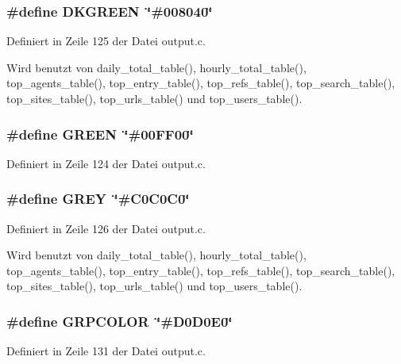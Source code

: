 \subsubsection{\setlength{\rightskip}{0pt plus 5cm}\#define DKGREEN~\char`\"{}\#008040\char`\"{}}\label{output_8c_70a867a7d5bd5ff0aa67003c99b93a8f}




Definiert in Zeile 125 der Datei output.c.

Wird benutzt von daily\_\-total\_\-table(), hourly\_\-total\_\-table(), top\_\-agents\_\-table(), top\_\-entry\_\-table(), top\_\-refs\_\-table(), top\_\-search\_\-table(), top\_\-sites\_\-table(), top\_\-urls\_\-table() und top\_\-users\_\-table().
\subsubsection{\setlength{\rightskip}{0pt plus 5cm}\#define GREEN~\char`\"{}\#00FF00\char`\"{}}\label{output_8c_cfbc006ea433ad708fdee3e82996e721}




Definiert in Zeile 124 der Datei output.c.
\subsubsection{\setlength{\rightskip}{0pt plus 5cm}\#define GREY~\char`\"{}\#C0C0C0\char`\"{}}\label{output_8c_dce122f566c88a1eceeb79a635afa964}




Definiert in Zeile 126 der Datei output.c.

Wird benutzt von daily\_\-total\_\-table(), hourly\_\-total\_\-table(), top\_\-agents\_\-table(), top\_\-entry\_\-table(), top\_\-refs\_\-table(), top\_\-search\_\-table(), top\_\-sites\_\-table(), top\_\-urls\_\-table() und top\_\-users\_\-table().
\subsubsection{\setlength{\rightskip}{0pt plus 5cm}\#define GRPCOLOR~\char`\"{}\#D0D0E0\char`\"{}}\label{output_8c_d3d0166d909c5f2c8461b42d87f1f778}




Definiert in Zeile 131 der Datei output.c.

